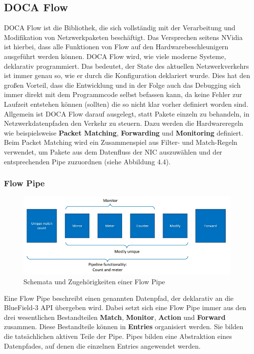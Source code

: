 \subsection{DOCA Flow}
DOCA Flow ist die Bibliothek, die sich vollständig mit der Verarbeitung und Modifikation von Netzwerkpaketen beschäftigt. Das Versprechen seitens NVidia ist hierbei, dass alle Funktionen von Flow auf den Hardwarebeschleunigern ausgeführt werden können. DOCA Flow wird, wie viele moderne Systeme, deklarativ programmiert. Das bedeutet, der State des aktuellen Netzwerkverkehrs ist immer genau so, wie er durch die Konfiguration deklariert wurde. Dies hat den großen Vorteil, dass die Entwicklung und in der Folge auch das Debugging sich immer direkt mit dem Programmcode selbst befassen kann, da keine Fehler zur Laufzeit entstehen können (sollten) die so nicht klar vorher definiert worden sind.
Allgemein ist DOCA Flow darauf ausgelegt, statt Pakete einzeln zu behandeln, in Netzwerkdatenpfaden den Verkehr zu steuern. Dazu werden die Hardwareregeln wie beispielsweise \textbf{Packet Matching}, \textbf{Forwarding} und \textbf{Monitoring} definiert. Beim Packet Matching wird ein Zusammenspiel aus Filter- und Match-Regeln verwendet, um Pakete aus dem Datenfluss der NIC auszuwählen und der entsprechenden Pipe zuzuordnen (siehe Abbildung 4.4). \cite{nvidia_doca_flow_2025}
\subsubsection{Flow Pipe}
\begin{figure}
    \centering
    \includegraphics[width=1\linewidth]{images/pipe.png}
    \caption{Schemata und Zugehörigkeiten einer Flow Pipe}
    \label{fig:enter-label}
\end{figure}
Eine Flow Pipe beschreibt einen genannten Datenpfad, der deklarativ an die BlueField-3 API übergeben wird. Dabei setzt sich eine Flow Pipe immer aus den drei wesentlichen Bestandteilen \textbf{Match}, \textbf{Monitor}, \textbf{Action} und \textbf{Forward} zusammen. Diese Bestandteile können in \textbf{Entries} organisiert werden. Sie bilden die tatsächlichen aktiven Teile der Pipe. Pipes bilden eine Abstraktion eines Datenpfades, auf denen die einzelnen Entries angewendet werden.

